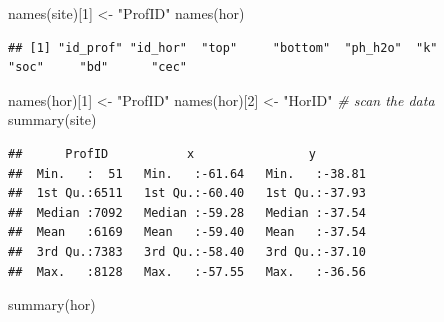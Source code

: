 \documentclass[
  10pt,
  b5paper,
  oneside]{book}
\newenvironment{Shaded}{\begin{snugshade}}{\end{snugshade}}
\newcommand{\CommentTok}[1]{\textcolor[rgb]{0.56,0.35,0.01}{\textit{#1}}}
\newcommand{\DecValTok}[1]{\textcolor[rgb]{0.00,0.00,0.81}{#1}}
\newcommand{\FunctionTok}[1]{\textcolor[rgb]{0.00,0.00,0.00}{#1}}
\newcommand{\NormalTok}[1]{#1}
\newcommand{\OtherTok}[1]{\textcolor[rgb]{0.56,0.35,0.01}{#1}}
\newcommand{\StringTok}[1]{\textcolor[rgb]{0.31,0.60,0.02}{#1}}
\begin{document}
\begin{Shaded}
\begin{Highlighting}[]
\FunctionTok{names}\NormalTok{(site)[}\DecValTok{1}\NormalTok{] }\OtherTok{\textless{}{-}} \StringTok{"ProfID"}
\FunctionTok{names}\NormalTok{(hor)}
\end{Highlighting}
\end{Shaded}

\begin{verbatim}
## [1] "id_prof" "id_hor"  "top"     "bottom"  "ph_h2o"  "k"       "soc"     "bd"      "cec"
\end{verbatim}

\begin{Shaded}
\begin{Highlighting}[]
\FunctionTok{names}\NormalTok{(hor)[}\DecValTok{1}\NormalTok{] }\OtherTok{\textless{}{-}} \StringTok{"ProfID"}
\FunctionTok{names}\NormalTok{(hor)[}\DecValTok{2}\NormalTok{] }\OtherTok{\textless{}{-}} \StringTok{"HorID"}
\CommentTok{\# scan the data}
\FunctionTok{summary}\NormalTok{(site)}
\end{Highlighting}
\end{Shaded}

\begin{verbatim}
##      ProfID           x                y         
##  Min.   :  51   Min.   :-61.64   Min.   :-38.81  
##  1st Qu.:6511   1st Qu.:-60.40   1st Qu.:-37.93  
##  Median :7092   Median :-59.28   Median :-37.54  
##  Mean   :6169   Mean   :-59.40   Mean   :-37.54  
##  3rd Qu.:7383   3rd Qu.:-58.40   3rd Qu.:-37.10  
##  Max.   :8128   Max.   :-57.55   Max.   :-36.56
\end{verbatim}

\begin{Shaded}
\begin{Highlighting}[]
\FunctionTok{summary}\NormalTok{(hor)}
\end{Highlighting}
\end{Shaded}
\end{document}
